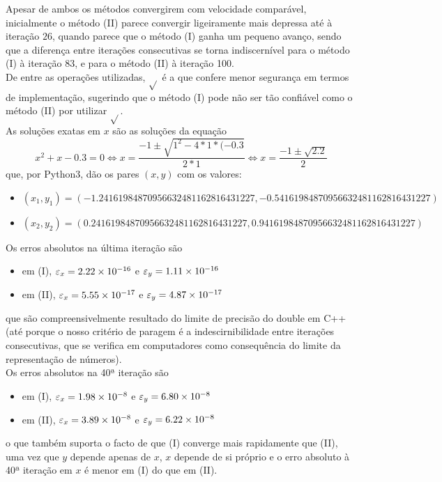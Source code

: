 Apesar de ambos os métodos convergirem com velocidade comparável, inicialmente o método (II) parece convergir ligeiramente mais depressa até à iteração $26$, quando parece que o método (I) ganha um pequeno avanço, sendo que a diferença entre iterações consecutivas se torna indiscernível para o método (I) à iteração 83, e para o método (II) à iteração 100.\\
De entre as operações utilizadas, $\sqrt{}$ é a que confere menor segurança em termos de implementação, sugerindo que o método (I) pode não ser tão confiável como o método (II) por utilizar $\sqrt{}$.\\
As soluções exatas em $x$ são as soluções da equação
\begin{equation*}
	x^2+x-0.3=0
	\iff x=\frac{-1\pm\sqrt{1^2-4*1*(-0.3}}{2*1}
	\iff x=\frac{-1\pm\sqrt{2.2}}{2}
\end{equation*}
que, por Python3, dão os pares $(x,y)$ com os valores:
\begin{itemize}
	\item $(x_1,y_1)=(-1.24161984870956632481162816431227,-0.54161984870956632481162816431227)$
	\item $(x_2,y_2)=(0.24161984870956632481162816431227,0.94161984870956632481162816431227)$
\end{itemize}
Os erros absolutos na última iteração são
\begin{itemize}
	\item em (I), $\varepsilon_x=\num{2.22E-16}$ e $\varepsilon_y=\num{1.11E-16}$
	\item em (II), $\varepsilon_x=\num{5.55E-17}$ e $\varepsilon_y=\num{4.87E-17}$ 
\end{itemize}
que são compreensivelmente resultado do limite de precisão do double em C++ (até porque o nosso critério de paragem é a indescirnibilidade entre iterações consecutivas, que se verifica em computadores como consequência do limite da representação de números).\\
Os erros absolutos na 40ª iteração são
\begin{itemize}
	\item em (I), $\varepsilon_x=\num{1.98E-8}$ e $\varepsilon_y=\num{6.80E-8}$
	\item em (II), $\varepsilon_x=\num{3.89E-8}$ e $\varepsilon_y=\num{6.22E-8}$ 
\end{itemize}
o que também suporta o facto de que (I) converge mais rapidamente que (II), uma vez que $y$ depende apenas de $x$, $x$ depende de si próprio e o erro absoluto à 40ª iteração em $x$ é menor em (I) do que em (II).